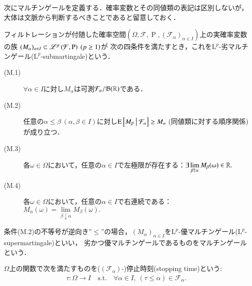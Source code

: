 	次にマルチンゲールを定義する．確率変数とその同値類の表記は区別しないが，大体は文脈から判断するべきことであると留意しておく．
	\begin{itembox}[l]{}
		\begin{dfn}[マルチンゲール]
			フィルトレーションが付随した確率空間$(\Omega,\mathcal{F},\operatorname{P},(\mathcal{F}_\alpha)_{\alpha \in I})$上の実確率変数の族
			$(M_\alpha)_{\alpha \in I} \subset \mathscr{L}^{p} \left(\mathcal{F},\operatorname{P}\right)\ (p \geq 1)$が
			次の四条件を満たすとき，これを$\mathrm{L}^p$-劣マルチンゲール($\mathrm{L}^p$-submartingale)という．
			\begin{description}
				\item[(M.1)] $\forall \alpha \in I$に対し$M_\alpha$は可測$\mathcal{F}_\alpha/\mathfrak{B}(\mathbb{R})$である．
				\item[(M.2)] 任意の$\alpha \leq \beta\ (\alpha,\beta \in I)$に対し$\cexp{M_\beta}{\mathcal{F}_\alpha} \geq M_\alpha\ $({\scriptsize 同値類に対する順序関係})が成り立つ．
				\item[(M.3)] 各$\omega \in \Omega$において，任意の$\alpha \in I$で左極限が存在する：$\exists \lim\limits_{\beta \uparrow \alpha} M_\beta(\omega) \in \mathbb{R}.$
				\item[(M.4)] 各$\omega \in \Omega$において，任意の$\alpha \in I$で右連続である：$M_\alpha(\omega) = \lim\limits_{\beta \downarrow \alpha} M_\beta(\omega).$
			\end{description}
			条件(M.2)の不等号が逆向き''$\leq$''の場合，$(M_\alpha)_{\alpha \in I}$を$\mathrm{L}^p$-優マルチンゲール($\mathrm{L}^p$-supermartingale)といい，
			劣かつ優マルチンゲールであるものをマルチンゲールという．
			\label{dfn:martingale}
		\end{dfn}
	\end{itembox}
	
	\begin{itembox}[l]{}
		\begin{dfn}[停止時刻]
			$\Omega$上の関数で次を満たすものを($(\mathcal{F}_\alpha)$-)停止時刻(stopping time)という:
			\begin{align}
				\tau:\Omega \longrightarrow I\quad \mathrm{s.t.}\quad \forall \alpha \in I,\ (\tau \leq \alpha) \in \mathcal{F}_\alpha.
			\end{align}
		\end{dfn}
	\end{itembox}
	
